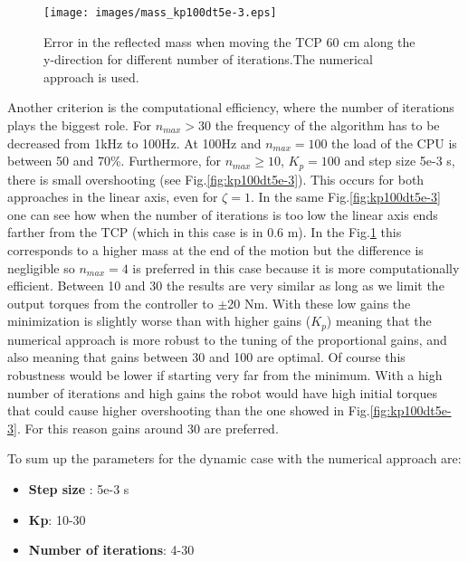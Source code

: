 \begin{figure}[!htb]
	\centerline{
		\texttt{[image: images/mass\_kp100dt5e-3.eps]}}
	\caption{Error in the reflected mass when moving the TCP 60 cm along the y-direction for different number of iterations.The numerical approach is used.}
	\label{fig:mass_kp100dt5e-3}
\end{figure}

Another criterion is the computational efficiency, where the number of iterations plays the biggest role. For $n_{max} > 30$ the frequency of the algorithm has to be decreased from 1kHz to 100Hz. At 100Hz and $n_{max} = 100$ the load of the CPU is between 50 and 70\%. Furthermore, for  $n_{max} \ge 10$,  $K_p=100$ and step size 5e-3 s,  there is small overshooting (see Fig.\ref{fig:kp100dt5e-3}). This occurs for both approaches in the linear axis, even for $\zeta = 1$. In the same Fig.\ref{fig:kp100dt5e-3} one can see how when the number of iterations is too low the linear axis ends farther from the TCP (which in this case is in 0.6 m). In the Fig.\ref{fig:mass_kp100dt5e-3} this corresponds to a higher mass at the end of the motion but the difference is negligible so $n_{max} = 4$ is preferred in this case because it is more computationally efficient. 
Between 10 and 30 the results are very similar as long as we limit the output torques from the controller to $\pm$20 Nm. With these low gains the minimization is slightly worse than with higher gains ($K_p$) meaning that the numerical approach is more robust to the tuning of the proportional gains, and also meaning that gains between 30 and 100 are optimal.
Of course this robustness would be lower if starting very far from the minimum. With a high number of iterations and high gains the robot would have high initial torques that could cause higher overshooting than the one showed in Fig.\ref{fig:kp100dt5e-3}. For this reason gains around 30 are preferred. 

To sum up the parameters for the dynamic case with the numerical approach are:
 \begin{itemize}  
 	\item \textbf{Step size} : 5e-3 s
 	\item \textbf{Kp}: 10-30
    \item \textbf{Number of iterations}: 4-30
  \end{itemize} 
 

